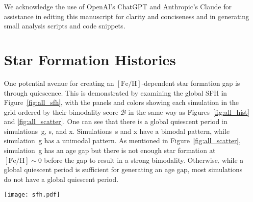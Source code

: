 \documentclass[twocolumn,linenumbers,trackchanges]{aastex631}
\newcommand{\FeH}{\ensuremath{[\textrm{Fe}/\textrm{H}]}}
\newcommand{\MgFe}{\ensuremath{[\textrm{Mg}/\textrm{Fe}]}}
\begin{document}
\begin{acknowledgements}
We acknowledge the use of OpenAI’s ChatGPT and Anthropic's Claude for assistance in editing this manuscript for clarity and conciseness and in generating small analysis scripts and code snippets.

\end{acknowledgements}

{}



\appendix
\section{Star Formation Histories}\label{app:all_sfh}
One potential avenue for creating an \FeH{}-dependent star formation gap is through quiescence. This is demonstrated by examining the global SFH in Figure~\ref{fig:all_sfh}, with the panels and colors showing each simulation in the grid ordered by their bimodality score $\mathcal{B}$ in the same way as Figures~\ref{fig:all_hist} and \ref{fig:all_scatter}. One can see that there is a global quiescent period in simulations~g, s, and x. Simulations~s and x have a bimodal pattern, while simulation~g has a unimodal pattern. As mentioned in Figure~\ref{fig:all_scatter}, simulation~g has an age gap but there is not enough star formation at $\FeH\sim0$ before the gap to result in a strong bimodality. Otherwise, while a global quiescent period is sufficient for generating an age gap, most simulations do not have a global quiescent period.

\begin{figure*}
  \centering
  \texttt{[image: sfh.pdf]}
  \caption{Global star formation history (SFH) for each simulation, plotted in the same order as Figures~\ref{fig:all_hist} and \ref{fig:all_scatter}, with increasing bimodality score $\mathcal{B}$ from left to right. The colors correspond to the same simulations as in previous figures. A global quiescent period, characterized by a significant dip in the SFR, is observed in simulations~g, s, and x. Among these, simulations~s and x exhibit strong bimodal \MgFe{} distributions, while simulation~g remains unimodal due to insufficient early star formation at $\FeH\sim0$ before the quiescent phase. Most other simulations do not display a clear global quiescent period, indicating that such a phase is not strictly necessary for bimodality to emerge.}
  \label{fig:all_sfh}
\end{figure*}
\end{document}
